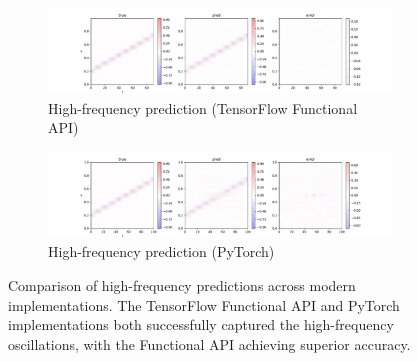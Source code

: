 \documentclass[10pt,journal,compsoc,onecolumn]{IEEEtran}
\begin{document}
\begin{figure}[htbp]
    \centering
    \begin{subfigure}[b]{0.3\textwidth}
        \includegraphics[width=\textwidth]{../../results/functional/high-frequency-adabelief-20250206-1520-1/vis}
        \caption{High-frequency prediction (TensorFlow Functional API)}
        \label{fig:high_freq_functional}
    \end{subfigure}
    \begin{subfigure}[b]{0.3\textwidth}
        \includegraphics[width=\textwidth]{../../results/pytorch/high-frequency-adabelief-20250206-1607-1/vis}
        \caption{High-frequency prediction (PyTorch)}
        \label{fig:high_freq_pytorch}
    \end{subfigure}
    \caption{Comparison of high-frequency predictions across modern implementations. The TensorFlow Functional API and PyTorch implementations both successfully captured the high-frequency oscillations, with the Functional API achieving superior accuracy.}
    \label{fig:high_freq_comparison}
\end{figure}
\end{document}
